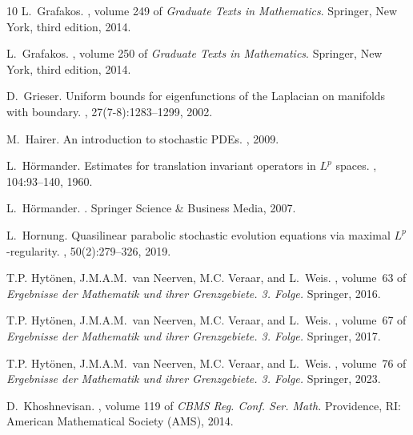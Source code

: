 \documentclass[reqno]{amsart}
\theoremstyle{plain}
\theoremstyle{remark}
\theoremstyle{plain}
\numberwithin{equation}{section}
\newcommand{\1}{\one}
\begin{document}
\begin{thebibliography}{10}
L.~Grafakos.
, volume 249 of {\em Graduate Texts
  in Mathematics}.
\newblock Springer, New York, third edition, 2014.

L.~Grafakos.
, volume 250 of {\em Graduate Texts in
  Mathematics}.
\newblock Springer, New York, third edition, 2014.

D.~Grieser.
\newblock Uniform bounds for eigenfunctions of the {Laplacian} on manifolds
  with boundary.
, 27(7-8):1283--1299, 2002.

M.~Hairer.
\newblock An introduction to stochastic {PDE}s.
, 2009.

L.~H{\"o}rmander.
\newblock Estimates for translation invariant operators in {{\(L^p\)}} spaces.
, 104:93--140, 1960.

L.~H{\"o}rmander.
.
\newblock Springer Science \& Business Media, 2007.

L.~Hornung.
\newblock Quasilinear parabolic stochastic evolution equations via maximal
  {$L^p$}-regularity.
, 50(2):279--326, 2019.

T.P. Hyt\"onen, J.M.A.M.~van Neerven, M.C. Veraar, and L.~Weis.
, volume~63 of {\em Ergebnisse der Mathematik und
  ihrer Grenzgebiete. 3. Folge.}
\newblock Springer, 2016.

T.P. Hyt\"onen, J.M.A.M.~van Neerven, M.C. Veraar, and L.~Weis.
, volume~67 of {\em Ergebnisse der
  Mathematik und ihrer Grenzgebiete. 3. Folge.}
\newblock Springer, 2017.

T.P. Hyt\"onen, J.M.A.M.~van Neerven, M.C. Veraar, and L.~Weis.
, volume~76 of {\em Ergebnisse der Mathematik und ihrer
  Grenzgebiete. 3. Folge.}
\newblock Springer, 2023.

D.~Khoshnevisan.
, volume
  119 of {\em CBMS Reg. Conf. Ser. Math.}
\newblock Providence, RI: American Mathematical Society (AMS), 2014.


\end{thebibliography}
\end{document}
